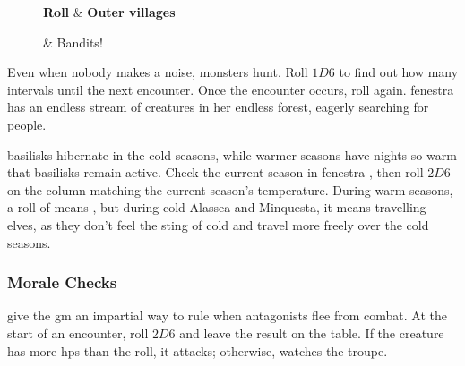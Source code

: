 \begin{multicols}{2}
\begin{figure*}[b!]
\begin{multicols}{3}
\setcounter{enc}{15}
\setcounter{diceNo}{13}
\vspace{2em}
\noindent
\begin{boxtable}[c|L]
  \hline
  \hline
  \textbf{Roll} & \textbf{Outer \Glspl{village}} \\
  \hline
  \hline
  \addtocounter{diceNo}{-1}
  \addtocounter{enc}{-1}
   & Bandits! \\
  \hline
  \hline
\end{boxtable}

\end{multicols}

\end{figure*}

\noindent
Even when nobody makes a noise, \glspl{monster} hunt.
Roll $1D6$ to find out how many \glspl{interval} until the next encounter.
Once the encounter occurs, roll again.
\Gls{fenestra} has an endless stream of creatures in her endless forest, eagerly searching for people.

\Glspl{basilisk} hibernate in the cold seasons, while warmer seasons have nights so warm that \glspl{basilisk} remain active.
Check the current season in \gls{fenestra} , then roll $2D6$ on the column matching the current season's temperature.
During warm seasons, a roll of   means , but during cold \gls{Alassea} and \gls{Minquesta}, it means travelling elves, as they don't feel the sting of cold%
and travel more freely over the cold seasons.

\subsubsection{Morale Checks}
\label{morale}
give the \gls{gm} an impartial way to rule when antagonists flee from combat.
At the start of an encounter, roll $2D6$ and leave the result on the table.
If the creature has more \glspl{hp} than the roll, it attacks; otherwise, watches the troupe.



\end{multicols}
